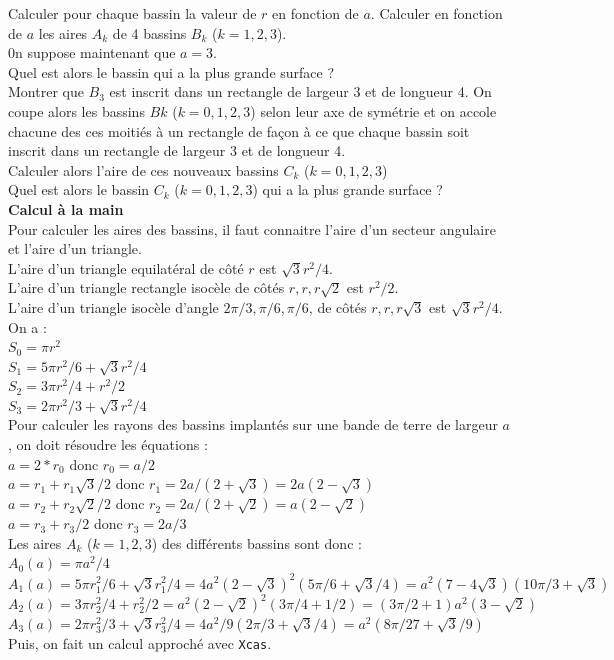 \documentclass[a4paper,11pt]{book}
\begin{document}
Calculer pour chaque bassin la valeur de $r$ en fonction de $a$.
Calculer en fonction de $a$ les aires $A_k$ de 4 bassins $B_k$ ($k=1,2,3$).\\
0n suppose maintenant que $a=3$. \\
Quel est alors le bassin qui a la plus grande surface ?\\
Montrer que $B_3$ est inscrit dans un rectangle de largeur 3 et de longueur 4.
On coupe alors les bassins $Bk$ ($k=0,1,2,3$) selon leur axe de sym\'etrie et 
on accole chacune des ces moiti\'es \`a un rectangle de fa\c{c}on \`a ce que 
chaque bassin soit inscrit dans un rectangle de largeur 3 et de longueur 4.\\
Calculer alors l'aire de ces nouveaux bassins $C_k$ ($k=0,1,2,3$)\\
Quel est alors le bassin $C_k$ ($k=0,1,2,3$) qui a la plus grande surface ?\\

{\bf Calcul \`a la main}\\
Pour calculer les aires des bassins, il faut connaitre l'aire d'un secteur
angulaire et l'aire d'un triangle.\\
L'aire d'un triangle equilat\'eral de c\^ot\'e $r$ est $\sqrt 3 r^2/4$.\\
L'aire d'un triangle rectangle isoc\`ele de c\^ot\'es $r,r,r\sqrt 2$ est 
$r^2/2$.\\
L'aire d'un triangle isoc\`ele d'angle $2\pi/3,\pi/6,\pi/6$, de c\^ot\'es 
$r,r,r\sqrt 3$ est $\sqrt 3 r^2/4$.\\
On a :\\
$S_0=\pi r^2$\\
$S_1=5\pi r^2/6+\sqrt 3 r^2/4$\\
$S_2=3\pi r^2/4+r^2/2$\\
$S_3=2\pi r^2/3+\sqrt 3 r^2/4$\\

Pour calculer les rayons des bassins implant\'es sur une bande de terre de 
largeur $a$, on doit r\'esoudre les \'equations :\\
$a=2*r_0$ donc $r_0=a/2$\\
$a=r_1+r_1\sqrt 3/2$ donc $r_1=2a/(2+\sqrt 3)=2a(2-\sqrt 3)$\\
$a=r_2+r_2\sqrt 2/2$ donc $r_2=2a/(2+\sqrt 2)=a(2-\sqrt 2)$\\
$a=r_3+r_3/2$ donc $r_3=2a/3$\\
Les aires $A_k$ ($k=1,2,3$) des diff\'erents bassins sont donc :\\
$A_0(a)=\pi a^2/4$
$A_1(a)=5\pi r_1^2/6+\sqrt 3 r_1^2/4=4a^2(2-\sqrt 3)^2(5\pi/6+\sqrt 3/4)=a^2(7-4\sqrt 3)(10\pi/3+\sqrt 3) $\\
$A_2(a)=3\pi r_2^2/4+r_2^2/2=a^2(2-\sqrt 2)^2(3\pi/4+1/2)=(3\pi/2+1) a^2(3-\sqrt 2)$\\
$A_3(a)=2\pi r_3^2/3+\sqrt 3 r_3^2/4=4a^2/9(2\pi /3+\sqrt 3/4)=a^2(8\pi /27+\sqrt 3/9)$\\
Puis, on fait un calcul approch\'e avec {\tt Xcas}.
\end{document}
